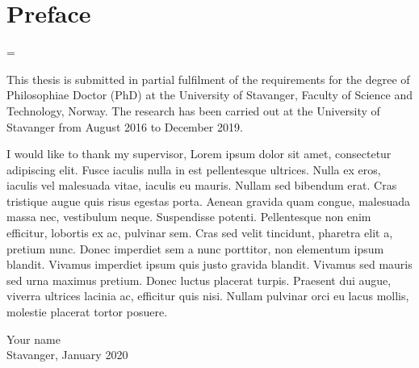 \chapter*{Preface}

\emergencystretch=\maxdimen
{}

This thesis is submitted in partial fulfilment of the requirements for the degree of Philosophiae Doctor (PhD) at the University of Stavanger, Faculty of Science and Technology, Norway. The research has been carried out at the University of Stavanger from August 2016 to December 2019.

I would like to thank my supervisor, Lorem ipsum dolor sit amet, consectetur adipiscing elit. Fusce iaculis nulla in est pellentesque ultrices. Nulla ex eros, iaculis vel malesuada vitae, iaculis eu mauris. Nullam sed bibendum erat. Cras tristique augue quis risus egestas porta. Aenean gravida quam congue, malesuada massa nec, vestibulum neque. Suspendisse potenti. Pellentesque non enim efficitur, lobortis ex ac, pulvinar sem. Cras sed velit tincidunt, pharetra elit a, pretium nunc. Donec imperdiet sem a nunc porttitor, non elementum ipsum blandit. Vivamus imperdiet ipsum quis justo gravida blandit. Vivamus sed mauris sed urna maximus pretium. Donec luctus placerat turpis. Praesent dui augue, viverra ultrices lacinia ac, efficitur quis nisi. Nullam pulvinar orci eu lacus mollis, molestie placerat tortor posuere. 
 
\vspace{60pt}

Your name\\
Stavanger, January 2020